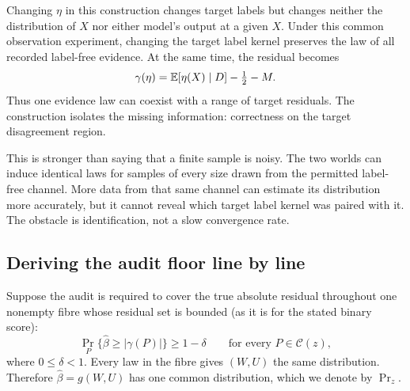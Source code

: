 Changing $\eta$ in this construction changes target labels but changes neither the distribution of
$X$ nor either model's output at a given $X$.  Under this common observation experiment, changing
the target label kernel preserves the law of all recorded label-free evidence.  At the same time,
the residual becomes
\begin{equation}
  \gamma(\eta)
  =\mathbb{E}[\eta(X)\mid D]-\tfrac12-M.
  \label{fr:eq-kernel-residual}
\end{equation}
Thus one evidence law can coexist with a range of target residuals.  The construction isolates the
missing information: correctness on the target disagreement region.

This is stronger than saying that a finite sample is noisy.  The two worlds can induce identical
laws for samples of every size drawn from the permitted label-free channel.  More data from that
same channel can estimate its distribution more accurately, but it cannot reveal which target
label kernel was paired with it.  The obstacle is identification, not a slow convergence rate.

\subsection{Deriving the audit floor line by line}
\label{fr:subsec-audit-proof}

Suppose the audit is required to cover the true absolute residual throughout one nonempty fibre
whose residual set is bounded (as it is for the stated binary score):
\begin{equation}
  \Pr_P\{\widehat\beta\ge|\gamma(P)|\}\ge1-\delta
  \qquad\text{for every }P\in\mathcal C(z),
  \label{fr:eq-audit-validity}
\end{equation}
where $0\le\delta<1$.  Every law in the fibre gives $(W,U)$ the same distribution.  Therefore
$\widehat\beta=g(W,U)$ has one common distribution, which we denote by $\Pr_z$.

